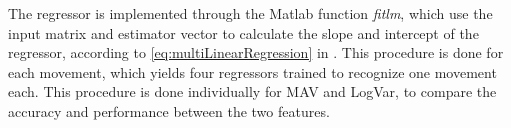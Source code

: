 %
%

The regressor is implemented through the Matlab function \textit{fitlm}, which use the input matrix and estimator vector to calculate the slope and intercept of the regressor, according to \eqref{eq:multiLinearRegression} in .
This procedure is done for each movement, which yields four regressors trained to recognize one movement each. This procedure is done individually for MAV and LogVar, to compare the accuracy and performance between the two features. 

